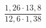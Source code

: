 \begin{ex}
	\begin{condition}
		\( \dfrac{1,26\cdot13,8}{12,6\cdot1,38} \)
	\end{condition}
\end{ex}